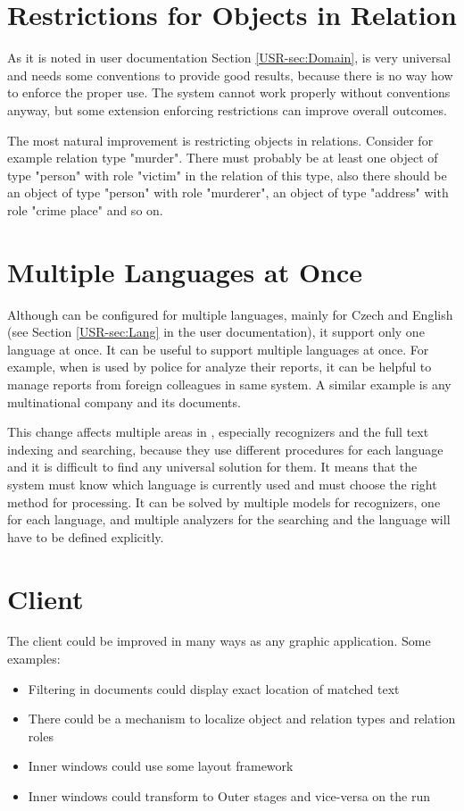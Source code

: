 \section{Restrictions for Objects in Relation}
As it is noted in user documentation Section \ref{USR-sec:Domain},
\textan{} is very universal and needs some conventions to provide good results,
because there is no way how to enforce the proper use. The system cannot work
properly without conventions anyway, but some extension enforcing restrictions
can improve overall outcomes.

The most natural improvement is restricting objects in relations. Consider for
example relation type "murder". There must probably be at least one object of
type "person" with role "victim" in the relation of this type, also there
should be an object of type "person" with role "murderer", an object of type
"address" with role "crime place" and so on.

\section{Multiple Languages at Once}
Although \textan{} can be configured for multiple languages, mainly for Czech
and English (see Section \ref{USR-sec:Lang} in the user documentation), it
support only one language at once. It can be useful to support multiple
languages at once. For example, when \textan{} is used by police for analyze
their reports, it can be helpful to manage reports from foreign colleagues in
same system. A similar example is any multinational company and its documents.

This change affects multiple areas in \textan{}, especially recognizers and
the full text indexing and searching, because they use different procedures for
each language and it is difficult to find any universal solution for them. It
means that the system must know which language is currently used and must choose
the right method for processing. It can be solved by multiple models for
recognizers, one for each language, and multiple analyzers for the searching and
the language will have to be defined explicitly.

\section{Client}
The \textan{} client could be improved in many ways as any graphic application.
Some examples:

\begin{itemize}
	\item Filtering in documents could display exact location of matched text
	\item There could be a mechanism to localize object and relation types and
	relation roles
	\item Inner windows could use some layout framework
	\item Inner windows could transform to Outer stages and vice-versa on the
	run
\end{itemize}
